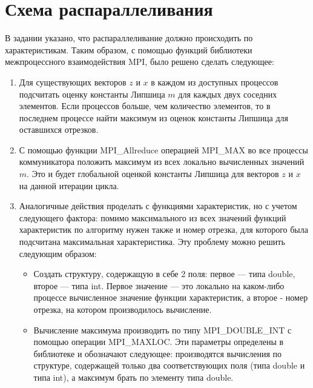 \documentclass{report}
\begin{document}
\section*{Схема распараллеливания}
В задании указано, что распараллеливание должно происходить по характеристикам. Таким образом, с помощью функций библиотеки межпроцессного взаимодействия MPI, было решено сделать следующее:
\begin{enumerate}
\item Для существующих векторов $z$ и $x$ в каждом из доступных процессов подсчитать оценку константы Липшица $m$ для каждых двух соседних элементов. Если процессов больше, чем количество элементов, то в последнем процессе найти максимум из оценок константы Липшица для оставшихся отрезков.
\item С помощью функции MPI\_Allreduce операцией MPI\_MAX во все процессы коммуникатора положить максимум из всех локально вычисленных значений $m$. Это и будет глобальной оценкой константы Липшица для векторов $z$ и $x$ на данной итерации цикла. 
\item Аналогичные действия проделать с функциями характеристик, но с учетом следующего фактора: помимо максимального из всех значений функций характеристик по алгоритму нужен также и номер отрезка, для которого была подсчитана максимальная характеристика. Эту проблему можно решить следующим образом:
\begin{itemize}
\item Создать структуру, содержащую в себе 2 поля: первое --- типа double, второе --- типа int. Первое значение --- это локально на каком-либо процессе вычисленное значение функции характеристик, а второе - номер отрезка, на котором производилось вычисление.
\item Вычисление максимума производить по типу MPI\_DOUBLE\_INT с помощью операции MPI\_MAXLOC. Эти параметры определены в библиотеке и обозначают следующее: производятся вычисления по структуре, содержащей только два соответствующих поля (типа double и типа int), а максимум брать по элементу типа double.
\end{itemize}
\end{enumerate}

\newpage

\end{document}

